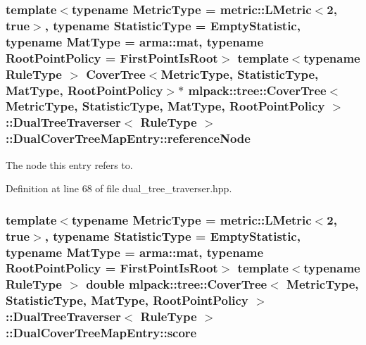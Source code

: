 \subsubsection[{reference\+Node}]{\setlength{\rightskip}{0pt plus 5cm}template$<$typename Metric\+Type  = metric\+::\+L\+Metric$<$2, true$>$, typename Statistic\+Type  = Empty\+Statistic, typename Mat\+Type  = arma\+::mat, typename Root\+Point\+Policy  = First\+Point\+Is\+Root$>$ template$<$typename Rule\+Type $>$ {\bf Cover\+Tree}$<$Metric\+Type, Statistic\+Type, Mat\+Type, Root\+Point\+Policy$>$$\ast$ {\bf mlpack\+::tree\+::\+Cover\+Tree}$<$ Metric\+Type, Statistic\+Type, Mat\+Type, Root\+Point\+Policy $>$\+::{\bf Dual\+Tree\+Traverser}$<$ Rule\+Type $>$\+::Dual\+Cover\+Tree\+Map\+Entry\+::reference\+Node}\label{structmlpack_1_1tree_1_1CoverTree_1_1DualTreeTraverser_1_1DualCoverTreeMapEntry_a57bba7183f10730011580cb98fb8e863}


The node this entry refers to. 



Definition at line 68 of file dual\+\_\+tree\+\_\+traverser.\+hpp.

\subsubsection[{score}]{\setlength{\rightskip}{0pt plus 5cm}template$<$typename Metric\+Type  = metric\+::\+L\+Metric$<$2, true$>$, typename Statistic\+Type  = Empty\+Statistic, typename Mat\+Type  = arma\+::mat, typename Root\+Point\+Policy  = First\+Point\+Is\+Root$>$ template$<$typename Rule\+Type $>$ double {\bf mlpack\+::tree\+::\+Cover\+Tree}$<$ Metric\+Type, Statistic\+Type, Mat\+Type, Root\+Point\+Policy $>$\+::{\bf Dual\+Tree\+Traverser}$<$ Rule\+Type $>$\+::Dual\+Cover\+Tree\+Map\+Entry\+::score}\label{structmlpack_1_1tree_1_1CoverTree_1_1DualTreeTraverser_1_1DualCoverTreeMapEntry_a5efd1f76f06c158a4efd207179e935fe}



